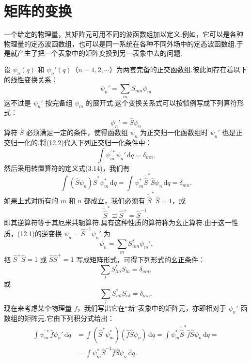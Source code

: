 \section{矩阵的变换}

一个给定的物理量，其矩阵元可用不同的波函数组加以定义.例如，它可以是各种物理量的定态波函数组，也可以是同一系统在各种不同外场中的定态波函数组.于是就产生了把一个表象中的矩阵变换到另一表象中去的问题.

设 $\psi_n(q)$ 和 $\psi_n'(q)$（$n=1,2,\cdots$）为两套完备的正交函数组.彼此间存在着以下的线性变换关系：
\begin{equation}
  \psi_n'=\sum_mS_{mn}\psi_m
\end{equation}
这不过是 $\psi_n'$ 按完备组 $\psi_m$ 的展开式.这个变换关系式可以按惯例写成下列算符形式：
\begin{equation}
  \psi_n'=\hat{S}\psi_n
\end{equation}
算符 $\hat{S}$ 必须满足一定的条件，使得函数组 $\psi_n$ 为正交归一化函数组时 $\psi_n'$ 也是正交归一化的.将(12.2)代入下列正交归一化条件中：
\begin{equation*}
  \int\psi_m^{\prime *}\psi_n'\,\mathrm{d}q=\delta_{mn}.
\end{equation*}
然后采用转置算符的定义式(3.14)，我们有
\begin{equation*}
  \int(\hat{S}\psi_n)\hat{S}^{*}\psi_m^{*}\,\mathrm{d}q
  =\int\psi_m^{*}\tilde{\hat{S}}^{*}\hat{S}\psi_n\,\mathrm{d}q=\delta_{mn}.
\end{equation*}
如果上式对所有的 $m$ 和 $n$ 都成立，我们必须有 $\tilde{\hat{S}}^{*}\,\hat{S}=1$，或
\begin{equation}
  \tilde{\hat{S}}^{*}\equiv\hat{S}^{+}=\hat{S}^{-1}.
\end{equation}
即其逆算符等于其厄米共轭算符.具有这种性质的算符称为幺正算符.由于这一性质，(12.1)的逆变换 $\psi_n=\hat{S}^{-1}\psi_n'$ 为
\begin{equation}
  \psi_n=\sum_mS_{nm}^{*}\psi_m'.
\end{equation}
把 $\hat{S}^{+}\hat{S}=1$ 或 $\hat{S}\hat{S}^{+}=1$ 写成矩阵形式，可得下列形式的幺正条件：
\begin{equation}
  \sum_lS_{lm}^{*}S_{ln}=\delta_{mn},
\end{equation}
或
\begin{equation}
  \sum_lS_{ml}^{*}S_{nl}=\delta_{mn}.
\end{equation}
现在来考虑某个物理量 $f$，我们写出它在“新”表象中的矩阵元，亦即相对于 $\psi_n'$ 函数组的矩阵元.它由下列积分式给出：
\begin{equation*}
\begin{aligned}
  \int\psi_m^{\prime *}\hat{f}\psi_n'\,\mathrm{d}q
  &=\int(\hat{S}^{*}\psi_m^{*})(\hat{f}\hat{S}\psi_n)\,\mathrm{d}q
  =\int\psi_m^{*}\tilde{\hat{S}}^{*}\hat{f}\hat{S}\psi_n\,\mathrm{d}q=\\
  &=\int\psi_m^{*}\hat{S}^{-1}\hat{f}\hat{S}\psi_n\,\mathrm{d}q.
\end{aligned}
\end{equation*}
